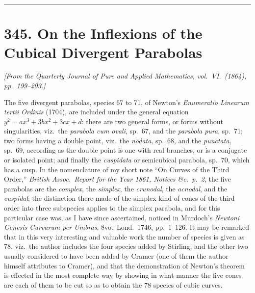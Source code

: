 \documentclass[11pt,a4paper]{article}
\begin{document}
\bigskip
\noindent\rule{\textwidth}{0.4pt}
\bigskip

\section*{345. On the Inflexions of the Cubical Divergent Parabolas}

\noindent\textit{[From the Quarterly Journal of Pure and Applied Mathematics, vol.~VI.\ (1864), pp.~199--203.]}

\medskip

The five divergent parabolas, species 67 to 71, of Newton's \textit{Enumeratio Linearum tertii Ordinis} (1704), are included under the general equation $y^2 = ax^3 + 3bx^2 + 3cx + d$: there are two general forms, or forms without singularities, viz.\ the \emph{parabola cum ovali}, sp.\ 67, and the \emph{parabola pura}, sp.\ 71; two forms having a double point, viz.\ the \emph{nodata}, sp.\ 68, and the \emph{punctata}, sp.\ 69, according as the double point is one with real branches, or is a conjugate or isolated point; and finally the \emph{cuspidata} or semicubical parabola, sp.\ 70, which has a cusp. In the nomenclature of my short note ``On Curves of the Third Order,'' \textit{British Assoc.\ Report for the Year 1861, Notices \&c.\ p.~2}, the five parabolas are the \emph{complex}, the \emph{simplex}, the \emph{crunodal}, the \emph{acnodal}, and the \emph{cuspidal}; the distinction there made of the simplex kind of cones of the third order into three subspecies applies to the simplex parabola, and for this particular case was, as I have since ascertained, noticed in Murdoch's \textit{Newtoni Genesis Curvarum per Umbras}, 8vo.\ Lond.\ 1746, pp.~1--126. It may be remarked that in this very interesting and valuable work the number of species is given as 78, viz.\ the author includes the four species added by Stirling, and the other two usually considered to have been added by Cramer (one of them the author himself attributes to Cramer), and that the demonstration of Newton's theorem is effected in the most complete way by showing in what manner the five cones are each of them to be cut so as to obtain the 78 species of cubic curves.

\medskip
\end{document}
